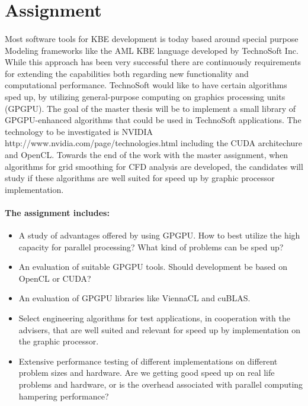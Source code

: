 
\section*{Assignment}

\paragraph{} %
Most software tools for KBE development is today based around special purpose Modeling frameworks like the AML KBE language developed by TechnoSoft Inc. While this approach has been very successful there are continuously requirements for extending the capabilities both regarding new functionality and computational performance. TechnoSoft would like to have certain algorithms sped up, by utilizing general-purpose computing on graphics processing units (GPGPU). The goal of the master thesis will be to implement a small library of GPGPU-enhanced algorithms that could be used in TechnoSoft applications. The technology to be investigated is NVIDIA http://www.nvidia.com/page/technologies.html including the CUDA architechure and OpenCL. Towards the end of the work with the master assignment, when algorithms for grid smoothing for CFD analysis are developed, the candidates will study if these algorithms are well suited for speed up by graphic processor implementation.

\paragraph{The assignment includes:} %
\label{par:the_assignment_includes_}

\begin{itemize}
\item A study of advantages offered by using GPGPU. How to best utilize the high capacity for parallel processing? What kind of problems can be sped up?
\item An evaluation of suitable GPGPU tools. Should development be based on OpenCL or CUDA?
\item An evaluation of GPGPU libraries like ViennaCL and cuBLAS.
\item Select engineering algorithms for test applications, in cooperation with the advisers, that are well suited and relevant for speed up by implementation on the graphic processor.
\item Extensive performance testing of different implementations on different problem sizes and hardware. Are we getting good speed up on real life problems and hardware, or is the overhead associated with parallel computing hampering performance?
\end{itemize}